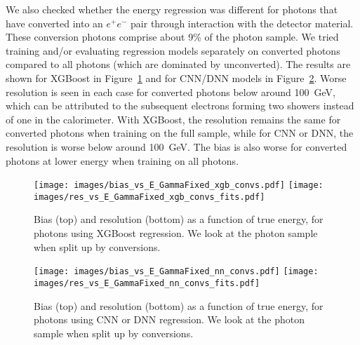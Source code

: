 We also checked whether the energy regression was different for photons that have converted into an $e^{+}e^{-}$ pair through interaction with the detector material.  These conversion photons comprise about 9\% of the photon sample.  We tried training and/or evaluating regression models separately on converted photons compared to all photons (which are dominated by unconverted).  The results are shown for XGBoost in Figure~\ref{fig:reg_xgb_conv_gamma} and for CNN/DNN models in Figure~\ref{fig:reg_nn_conv_gamma}.  Worse resolution is seen in each case for converted photons below around 100~GeV, which can be attributed to the subsequent electrons forming two showers instead of one in the calorimeter.  With XGBoost, the resolution remains the same for converted photons when training on the full sample, while for CNN or DNN, the resolution is worse below around 100~GeV.  The bias is also worse for converted photons at lower energy when training on all photons.

\begin{figure}[htbp]
\centering
\texttt{[image: images/bias\_vs\_E\_GammaFixed\_xgb\_convs.pdf]}
\texttt{[image: images/res\_vs\_E\_GammaFixed\_xgb\_convs\_fits.pdf]}
\caption{Bias (top) and resolution (bottom) as a function of true energy, for photons using XGBoost regression.  We look at the photon sample when split up by conversions.
}
\label{fig:reg_xgb_conv_gamma}
\end{figure}

\begin{figure}[htbp]
\centering
\texttt{[image: images/bias\_vs\_E\_GammaFixed\_nn\_convs.pdf]}
\texttt{[image: images/res\_vs\_E\_GammaFixed\_nn\_convs\_fits.pdf]}
\caption{Bias (top) and resolution (bottom) as a function of true energy, for photons using CNN or DNN regression.  We look at the photon sample when split up by conversions.
}
\label{fig:reg_nn_conv_gamma}
\end{figure}